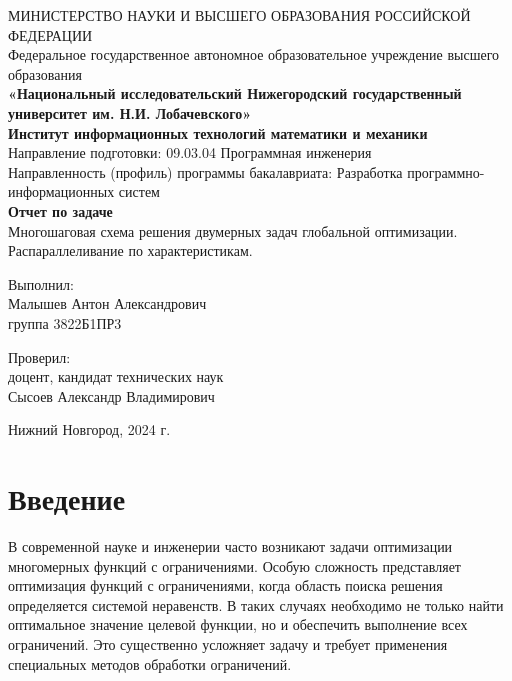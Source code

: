 \documentclass[12pt]{article}
\begin{document}
\begin{centering}
\thispagestyle{empty}
МИНИСТЕРСТВО НАУКИ И ВЫСШЕГО ОБРАЗОВАНИЯ РОССИЙСКОЙ ФЕДЕРАЦИИ\\
Федеральное государственное автономное образовательное учреждение высшего образования\\
    {\bfseries\large «Национальный исследовательский Нижегородский государственный университет им.
Н.И. Лобачевского»}\\
    {\bfseries\large Институт информационных технологий математики и механики }\\
    Направление подготовки: 09.03.04 Программная инженерия\\
Направленность (профиль) программы бакалавриата: Разработка программно-информационных систем\\


    \vspace{6cm} 
    {\LARGE\bfseries Отчет по задаче}\\
    {\large Многошаговая схема решения двумерных задач глобальной оптимизации. 
Распараллеливание по характеристикам.}\\
    \vspace{6cm} 

    {\hfill\parbox{0.5\textwidth}{%
        Выполнил:\\
        Малышев Антон Александрович\\
        группа 3822Б1ПР3\\
        
        \vspace{0.1cm}
        
        Проверил:\\
        доцент, кандидат технических наук\\
        Сысоев Александр Владимирович}
    }
    \vspace{2cm} 
    
    Нижний Новгород, 2024 г.
\newpage
\end{centering}

\tableofcontents
\newpage

\section{Введение}
В современной науке и инженерии часто возникают задачи оптимизации многомерных функций с ограничениями. Особую сложность представляет оптимизация функций с ограничениями, когда область поиска решения определяется системой неравенств. В таких случаях необходимо не только найти оптимальное значение целевой функции, но и обеспечить выполнение всех ограничений. Это существенно усложняет задачу и требует применения специальных методов обработки ограничений.
\end{document}
